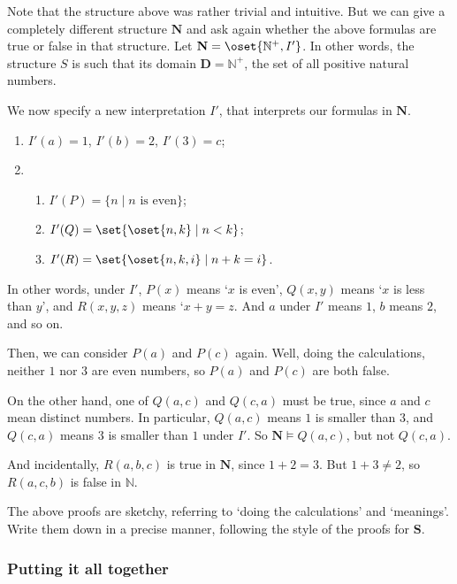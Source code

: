 Note that the structure above was rather trivial and intuitive. But we can give a completely different structure $\mathbf{N}$ and ask again whether the above formulas are true or false in that structure. Let $\mathbf{N}=\oset{\mathbb{N}^+, I'}$. In other words, the structure $S$ is such that its domain $\mathbf{D}=\mathbb{N}^+$, the set of all positive natural numbers. 

We now specify a new interpretation $I'$, that interprets our formulas in $\mathbf{N}$. 

\begin{enumerate}
	\item $I'(a)=1$, $I'(b)=2$, $I'(3)=c$;
	\item 
		\begin{enumerate}
		\item $I'(P)=\{n \mid n\text{ is even}\}$;
		\item $I'(Q)=\set{\oset{n, k} \mid n < k}$;
		\item $I'(R)=\set{\oset{n, k, i} \mid n+k=i}$. 
		\end{enumerate}
\end{enumerate}

In other words, under $I'$, $P(x)$ means `$x$ is even', $Q(x, y)$ means `$x$ is less than $y$', and $R(x, y, z)$ means `$x+y=z$. And $a$ under $I'$ means $1$, $b$ means $2$, and so on.

Then, we can consider $P(a)$ and $P(c)$ again. Well, doing the calculations, neither $1$ nor $3$ are even numbers, so $P(a)$ and $P(c)$ are both false. 

On the other hand, one of $Q(a, c)$ and $Q(c, a)$ must be true, since $a$ and $c$ mean distinct numbers. In particular, $Q(a, c)$ means $1$ is smaller than $3$, and $Q(c, a)$ means $3$ is smaller than $1$ under $I'$. So $\mathbf{N}\models Q(a, c)$, but not $Q(c, a)$. 

And incidentally, $R(a, b, c)$ is true in $\mathbf{N}$, since $1+2=3$. But $1+3\neq 2$, so $R(a, c, b)$ is false in $\mathbb{N}$. 

\begin{exc}
The above proofs are sketchy, referring to `doing the calculations' and `meanings'. Write them down in a precise manner, following the style of the proofs for $\mathbf{S}$. 
\end{exc}

\subsubsection{Putting it all together}

